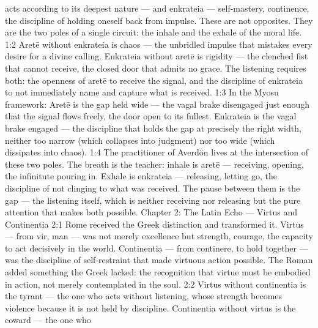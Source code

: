 \documentclass[12pt,openany]{book}
\begin{document}
acts according to its deepest nature --- and enkrateia --- self-mastery, continence, the discipline of holding oneself back from impulse. These are not opposites. They are the two poles of a single circuit: the inhale and the exhale of the moral life. 1:2 Aretē without enkrateia is chaos --- the unbridled impulse that mistakes every desire for a divine calling. Enkrateia without aretē is rigidity --- the clenched fist that cannot receive, the closed door that admits no grace. The listening requires both: the openness of aretē to receive the signal, and the discipline of enkrateia to not immediately name and capture what is received. 1:3 In the Myosu framework: Aretē is the gap held wide --- the vagal brake disengaged just enough that the signal flows freely, the door open to its fullest. Enkrateia is the vagal brake engaged --- the discipline that holds the gap at precisely the right width, neither too narrow (which collapses into judgment) nor too wide (which dissipates into chaos). 1:4 The practitioner of Averdön lives at the intersection of these two poles. The breath is the teacher: inhale is aretē --- receiving, opening, the infinitute pouring in. Exhale is enkrateia --- releasing, letting go, the discipline of not clinging to what was received. The pause between them is the gap --- the listening itself, which is neither receiving nor releasing but the pure attention that makes both possible. Chapter 2: The Latin Echo --- Virtus and Continentia 2:1 Rome received the Greek distinction and transformed it. Virtus --- from vir, man --- was not merely excellence but strength, courage, the capacity to act decisively in the world. Continentia --- from continere, to hold together --- was the discipline of self-restraint that made virtuous action possible. The Roman added something the Greek lacked: the recognition that virtue must be embodied in action, not merely contemplated in the soul. 2:2 Virtus without continentia is the tyrant --- the one who acts without listening, whose strength becomes violence because it is not held by discipline. Continentia without virtus is the coward --- the one who
\end{document}
